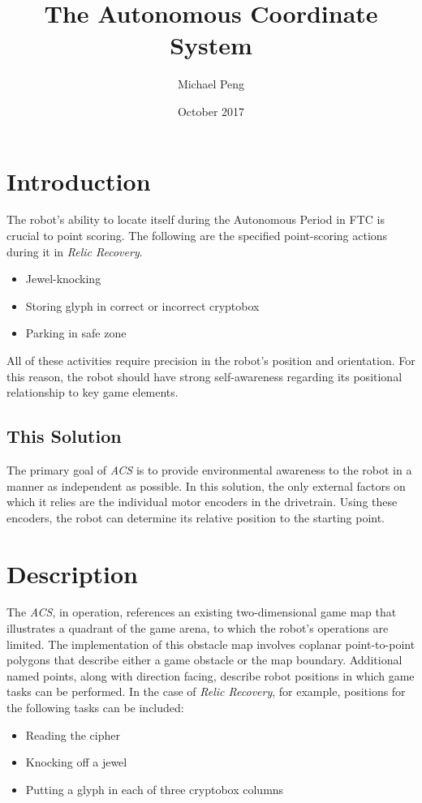 \documentclass{article}
\begin{document}
\title{The Autonomous Coordinate System}
\author{Michael Peng}
\date{October 2017}
\maketitle

\section{Introduction}
The robot's ability to locate itself during the Autonomous Period in FTC is crucial to point scoring. The following are the specified point-scoring actions during it in \emph{Relic Recovery}.
\begin{itemize}
    \item Jewel-knocking
    \item Storing glyph in correct or incorrect cryptobox
    \item Parking in safe zone
\end{itemize}
All of these activities require precision in the robot's position and orientation. For this reason, the robot should have strong self-awareness regarding its positional relationship to key game elements.

\subsection{This Solution}
The primary goal of \emph{ACS} is to provide environmental awareness to the robot in a manner as independent as possible. In this solution, the only external factors on which it relies are the individual motor encoders in the drivetrain. Using these encoders, the robot can determine its relative position to the starting point.

\section{Description}
The \emph{ACS}, in operation, references an existing two-dimensional game map that illustrates a quadrant of the game arena, to which the robot's operations are limited. The implementation of this obstacle map involves coplanar point-to-point polygons that describe either a game obstacle or the map boundary. Additional named points, along with direction facing, describe robot positions in which game tasks can be performed. In the case of \emph{Relic Recovery}, for example, positions for the following tasks can be included:
\begin{itemize}
    \item Reading the cipher
    \item Knocking off a jewel
    \item Putting a glyph in each of three cryptobox columns
\end{itemize}
\end{document}
